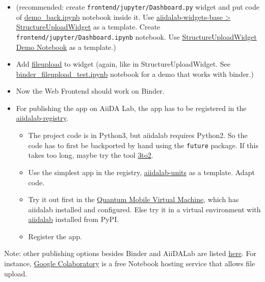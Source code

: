 \begin{itemize}
\tightlist
\item
  (recommended: create \texttt{frontend/jupyter/Dashboard.py} widget and
  put code of
  \href{./frontend/jupyter/demo/demo_backend.ipynb}{demo\_back.ipynb}
  notebook inside it. Use
  \href{https://github.com/aiidalab/aiidalab-widgets-base/blob/master/aiidalab_widgets_base/structures.py}{aiidalab-widgets-base
  \textgreater{} StructureUploadWidget} as a template. Create
  \texttt{frontend/jupyter/Dashboard.ipynb} notebook. Use
  \href{https://github.com/aiidalab/aiidalab-widgets-base/blob/master/structures.ipynb}{StructureUploadWidget
  Demo Notebook} as a template.)
\item
  Add \href{https://pypi.org/project/fileupload/}{fileupload} to widget
  (again, like in StructureUploadWidget. See
  \href{./frontend/jupyter/demo/binder_fileupload_test.ipynb}{binder\_fileupload\_test.ipynb}
  notebook for a demo that works with binder.)
\item
  Now the Web Frontend should work on Binder.
\item
  For publishing the app on AiiDA Lab, the app has to be registered in
  the
  \href{https://github.com/aiidalab/aiidalab-registry}{aiidalab-registry}.

  \begin{itemize}
  \tightlist
  \item
    The project code is in Python3, but aiidalab requires Python2. So
    the code has to first be backported by hand using the \texttt{future}
    package. If this takes too long, maybe try the tool
    \href{https://pypi.org/project/3to2/}{3to2}.
  \item
    Use the simplest app in the registry,
    \href{https://github.com/aiidalab/aiidalab-units}{aiidalab-units} as
    a template. Adapt code.
  \item
    Try it out first in the
    \href{https://www.materialscloud.org/work/quantum-mobile}{Quantum
    Mobile Virtual Machine}, which has aiidalab installed and
    configured. Else try it in a virtual environment with
    \href{https://pypi.org/project/aiidalab/}{aiidalab} installed from
    PyPI.
  \item
    Register the app.
  \end{itemize}
\end{itemize}

Note: other publishing options besides Binder and AiiDALab are listed
\href{https://github.com/markusschanta/awesome-jupyter}{here}. For
instance, \href{http://colab.research.google.com/}{Google Colaboratory}
is a free Notebook hosting service that allows file upload.

